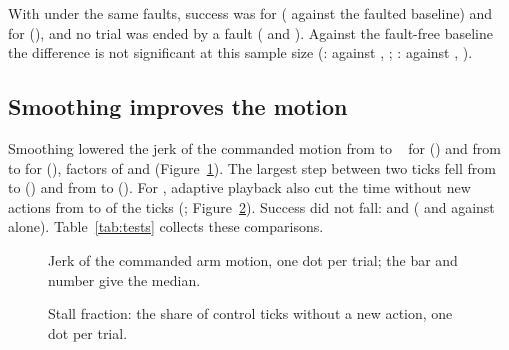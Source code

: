 With \drtc{} under the same faults, success was  for \smolvla{}
( against the faulted baseline) and  for \groot{}
(), and no trial was ended by a fault ( and
). Against the fault-free baseline the difference is not significant at this sample size
(\smolvla:  against , ;
\groot:  against , ).

\subsection{Smoothing improves the motion}

Smoothing lowered the jerk of the commanded motion from  to ~\jerkunit{}
for \smolvla{} () and from  to  for
\groot{} (), factors of  and 
(Figure~\ref{fig:jerk}). The largest step between two ticks fell from  to
 () and from  to
 (). For \groot, adaptive playback also cut the time without
new actions from  to  of the ticks (;
Figure~\ref{fig:stall}). Success did not fall:  and 
( and  against \drtc{} alone).
Table~\ref{tab:tests} collects these comparisons.

\begin{figure}[htbp]
  \centering
  \caption{Jerk of the commanded arm motion, one dot per trial; the bar and number give the median.}
  \label{fig:jerk}
\end{figure}

\begin{figure}[htbp]
  \centering
  \caption{Stall fraction: the share of control ticks without a new action, one dot per trial.}
  \label{fig:stall}
\end{figure}

